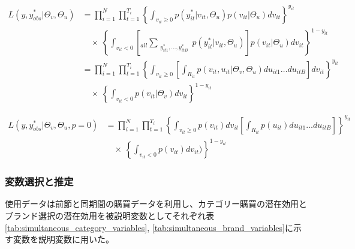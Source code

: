 \documentclass[11pt]{jsarticle}
\begin{document}
\begin{equation} \label{formulad2_14}
\begin{split}
L(y, y^\ast_{obs} | \Theta_{v}, \Theta_{u}) &= \prod_{i=1}^{N} \prod_{t=1}^{T_{i}}
\left\{
\int_{v_{it} \geq 0} p(y^\ast_{it} | v_{it}, \Theta_{u}) p(v_{it} | \Theta_{u}) dv_{it}
\right\}^{y_{it}} \\
& \quad \times \
\left\{
\int_{v_{it} < 0} 
\left[_{all}
\sum_{\substack{y^\ast_{it1}, \ldots, y^\ast_{itB}}} p(y^\ast_{it} | v_{it}, \Theta_{u})
\right] p(v_{it} | \Theta_{u}) dv_{it}
\right\}^{1 - y_{it}} \\
&= \prod_{i=1}^{N} \prod_{t=1}^{T_{i}}
\left\{
\int_{v_{it} \geq 0}
\left[
\int_{R_{it}} p(v_{it}, u_{it} | \Theta_{v}, \Theta_{u}) du_{it1} \ldots du_{itB}
\right] dv_{it}
\right\}^{y_{it}}\\
& \quad \times \
\left\{
\int_{v_{it} < 0} p(v_{it} | \Theta_{v}) dv_{it}
\right\}^{1 - y_{it}}
\end{split}
\end{equation}

\begin{equation} \label{formulad2_15}
\begin{split}
L(y, y^\ast_{obs} | \Theta_{v}, \Theta_{u}, p = 0) &= \prod_{i=1}^{N} \prod_{t=1}^{T_{i}}
\left\{
\int_{v_{it} \geq 0} p(v_{it}) dv_{it}
\left[
\int_{R_{it}} p(u_{it} ) du_{it1} \ldots du_{itB}
\right]
\right\}^{y_{it}} \\
& \quad \times \
\left\{
\int_{v_{it} < 0} p(v_{it})dv_{it})
\right\}^{1 - y_{it}}
\end{split}
\end{equation}

\subsubsection{変数選択と推定}
\label{subsec:simultaneous_variable}
使用データは前節と同期間の購買データを利用し、カテゴリー購買の潜在効用とブランド選択の潜在効用を被説明変数としてそれぞれ表\ref{tab:simultaneous_category_variables}, \ref{tab:simultaneous_brand_variables}に示す変数を説明変数に用いた。
\end{document}
